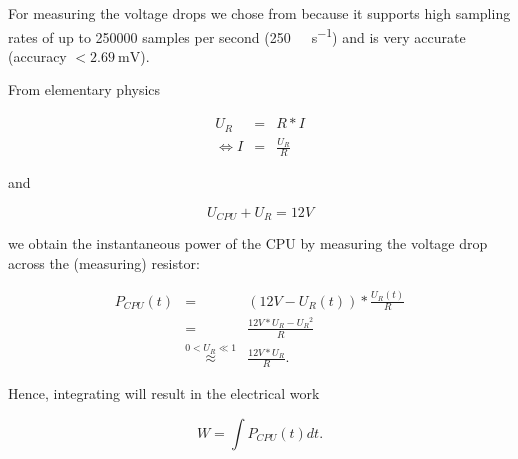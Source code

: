 For measuring the voltage drops we chose
from  because it supports
high sampling rates of up to 250000 samples per second
(\SI{250}{\kilo\samples\per\second}) and is very
accurate (accuracy $< \SI{2.69}{\milli\volt}$)\cite{NISpec2009}.


\label{sec:calc-work}

From elementary physics

\begin{eqnarray}
     U_R & = & R * I \\
  \iff I & = & \frac{U_R}{R}
\end{eqnarray}

and

\begin{equation}
  U_{CPU} + U_{R} = 12 V
\end{equation}

we obtain the instantaneous power of the CPU by measuring the voltage drop
across the (measuring) resistor:

\begin{eqnarray}
P_{CPU}(t) & = & (12V - U_R(t)) * \frac{U_R(t)}{R} \\
           & = & \frac{12V * U_R - {U_R}^2}{R} \\
           & \stackrel{0 < U_R \ll 1}{\approx} & \frac{12V * U_R}{R}.
\end{eqnarray}

Hence, integrating will result in the electrical work

\begin{equation}
  W = \int P_{CPU}(t)dt.
\end{equation}

